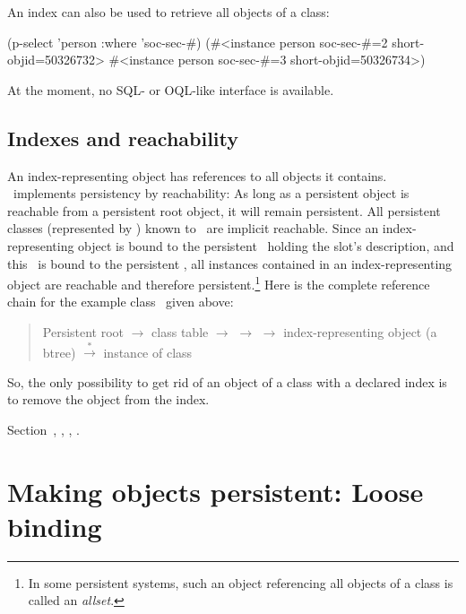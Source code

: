 An index can also be used to retrieve all objects of a class:
\begin{CompactCode}
\listener{}(p-select 'person :where 'soc-sec-#)
(#<instance person soc-sec-#=2 short-objid=50326732>
 #<instance person soc-sec-#=3 short-objid=50326734>)
\end{CompactCode}

At the moment, no SQL- or OQL-like interface is available.

\subsection{Indexes and reachability}%
\label{sec:SlotIndexAndReachability}%

An index-representing object has references to all objects it
contains. \plob\ implements persistency by
reachability: As long as a persistent object is reachable from a
persistent root object, it will remain persistent. All persistent
classes (represented by \clsdo[s]) known to \plob\ are implicit
reachable. Since an index-representing object is bound to the
persistent \sltdo\ holding the slot's description, and this \sltdo\ is
bound to the persistent \clsdo, all instances contained in an
index-representing object are reachable and therefore
persistent.\footnote{In some persistent systems, such an object
  referencing all objects of a class is called an \emph{allset}.} Here
is the complete reference chain for the example class \ 
given above:
\begin{quote}
  Persistent root $\rightarrow$ class table $\rightarrow$ \clsdo[{ of
    class \class{person}}] $\rightarrow$  $\rightarrow$ index-representing object (a
  btree) $\stackrel{*}{\rightarrow}$ instance of class
  {}
\end{quote}
So, the only possibility to get rid of an object of a class with a
declared index is to remove the object from the index.

 Section~,
, ,
.

\section[Loose Binding]%
{Making objects persistent: Loose binding}%
\label{sec:LooseBinding}

